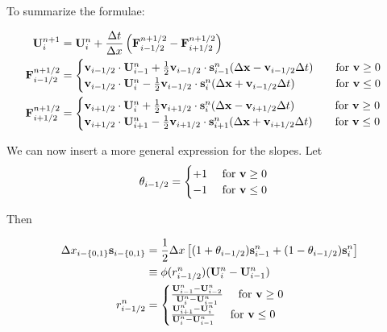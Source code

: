 To summarize the formulae:

\begin{align*}
	\mathbf{U}_i ^{n+1} &= 
		\mathbf{U}_i^{n} +  \frac{\Delta t}{\Delta x} \left( \mathbf{F}_{i-1/2}^{n+1/2} - \mathbf{F}_{i+1/2}^{n+1/2} \right) & \\
	\mathbf{F}_{i-1/2}^{n+1/2} &= 
		\begin{cases}
			\mathbf{v}_{i-1/2} \cdot \mathbf{U}_{i-1}^n +  \frac{1}{2} \mathbf{v}_{i-1/2} \cdot\mathbf{s}_{i-1}^n (\Delta \mathbf{x} -  \mathbf{v}_{i-1/2} \Delta t)
			 	& \quad \text{for } \mathbf{v} \geq 0 \\
			\mathbf{v}_{i-1/2} \cdot \mathbf{U}_{i}^n -\frac{1}{2} \mathbf{v}_{i-1/2} \cdot \mathbf{s}_{i}^n (\Delta \mathbf{x} + \mathbf{v}_{i-1/2} \Delta t)
				& \quad \text{for } \mathbf{v} \leq 0 \\
		\end{cases} \\
	\mathbf{F}_{i+1/2}^{n+1/2} &= 
		\begin{cases}
			\mathbf{v}_{i+1/2} \cdot \mathbf{U}_{i}^n +  \frac{1}{2} \mathbf{v}_{i+1/2} \cdot\mathbf{s}_{i}^n (\Delta \mathbf{x} -  \mathbf{v}_{i+1/2} \Delta t)
			 	& \quad \text{for } \mathbf{v} \geq 0 \\
			\mathbf{v}_{i+1/2} \cdot \mathbf{U}_{i+1}^n -\frac{1}{2} \mathbf{v}_{i+1/2} \cdot \mathbf{s}_{i+1}^n (\Delta \mathbf{x} + \mathbf{v}_{i+1/2} \Delta t)
				& \quad \text{for } \mathbf{v} \leq 0 \\
		\end{cases} \\		
\end{align*}





We can now insert a more general expression for the slopes.
Let 
\begin{align}
	\theta_{i-1/2} = \begin{cases} +1 \quad \text{ for } \mathbf{v} \geq 0 \\ -1 \quad  \text{ for } \mathbf{v} \leq{0} \end{cases}
\end{align}

Then

\begin{align}
	\Delta x_{i-\{0, 1\}} \mathbf{s}_{i-\{0,1\}} 
		&= \frac{1}{2} \Delta x \left[ (1 + \theta_{i-1/2}) \mathbf{s}_{i-1}^n + (1 - \theta_{i-1/2})  \mathbf{s}_{i}^n \right]  \\
	&\equiv \phi(r_{i-1/2}^n) (\mathbf{U}_i^n - \mathbf{U}_{i-1}^n ) \\
	r^n_{i-1/2} &= \begin{cases}
		\frac{\mathbf{U}_{i-1}^n - \mathbf{U}_{i-2}^n}{\mathbf{U}_{i}^n - \mathbf{U}_{i-1}^n} 	\quad \text{ for } \mathbf{v}  \geq 0 \\
		\frac{\mathbf{U}_{i+1}^n - \mathbf{U}_{i}^n}{\mathbf{U}_{i}^n - \mathbf{U}_{i-1}^n} 	\quad \text{ for } \mathbf{v}  \leq 0 \\
	\end{cases} 
\end{align}

